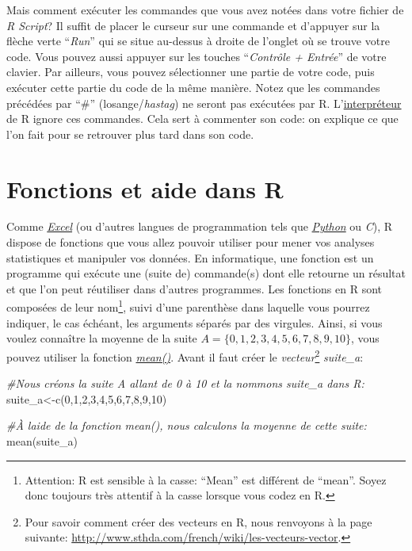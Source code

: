 \documentclass[
]{book}
\newenvironment{Shaded}{\begin{snugshade}}{\end{snugshade}}
\newcommand{\CommentTok}[1]{\textcolor[rgb]{0.56,0.35,0.01}{\textit{#1}}}
\newcommand{\DecValTok}[1]{\textcolor[rgb]{0.00,0.00,0.81}{#1}}
\newcommand{\FunctionTok}[1]{\textcolor[rgb]{0.00,0.00,0.00}{#1}}
\newcommand{\NormalTok}[1]{#1}
\newcommand{\OtherTok}[1]{\textcolor[rgb]{0.56,0.35,0.01}{#1}}
\begin{document}
Mais comment exécuter les commandes que vous avez notées dans votre fichier de \emph{R Script}? Il suffit de placer le curseur sur une commande et d'appuyer sur la flèche verte ``\emph{Run}'' qui se situe au-dessus à droite de l'onglet où se trouve votre code. Vous pouvez aussi appuyer sur les touches ``\emph{Contrôle + Entrée}'' de votre clavier. Par ailleurs, vous pouvez sélectionner une partie de votre code, puis exécuter cette partie du code de la même manière. Notez que les commandes précédées par ``\#'' (losange/\emph{hastag}) ne seront pas exécutées par R. L'\href{https://fr.wikipedia.org/wiki/Interpr\%C3\%A8te_(informatique)}{interpréteur} de R ignore ces commandes. Cela sert à commenter son code: on explique ce que l'on fait pour se retrouver plus tard dans son code.

\hypertarget{Fonctions_aides}{%
\section{Fonctions et aide dans R}\label{Fonctions_aides}}

Comme \href{https://www.microsoft.com/fr-be/microsoft-365/excel}{\emph{Excel}} (ou d'autres langues de programmation tels que \href{https://www.python.org/}{\emph{Python}} ou \emph{C}), R dispose de fonctions que vous allez pouvoir utiliser pour mener vos analyses statistiques et manipuler vos données. En informatique, une fonction est un programme qui exécute une (suite de) commande(s) dont elle retourne un résultat et que l'on peut réutiliser dans d'autres programmes. Les fonctions en R sont composées de leur nom\footnote{Attention: R est sensible à la casse: ``Mean'' est différent de ``mean''. Soyez donc toujours très attentif à la casse lorsque vous codez en R.}, suivi d'une parenthèse dans laquelle vous pourrez indiquer, le cas échéant, les arguments séparés par des virgules. Ainsi, si vous voulez connaître la moyenne de la suite \(A=\{0,1,2,3,4,5,6,7,8,9,10\}\), vous pouvez utiliser la fonction \href{https://www.rdocumentation.org/packages/base/versions/3.6.2/topics/mean}{\emph{mean()}}. Avant il faut créer le \emph{vecteur}\footnote{Pour savoir comment créer des vecteurs en R, nous renvoyons à la page suivante: \url{http://www.sthda.com/french/wiki/les-vecteurs-vector}.} \emph{suite\_a}:

\begin{Shaded}
\begin{Highlighting}[]
\CommentTok{\#Nous créons la suite A allant de 0 à 10 et la nommons suite\_a dans R:}
\NormalTok{suite\_a}\OtherTok{\textless{}{-}}\FunctionTok{c}\NormalTok{(}\DecValTok{0}\NormalTok{,}\DecValTok{1}\NormalTok{,}\DecValTok{2}\NormalTok{,}\DecValTok{3}\NormalTok{,}\DecValTok{4}\NormalTok{,}\DecValTok{5}\NormalTok{,}\DecValTok{6}\NormalTok{,}\DecValTok{7}\NormalTok{,}\DecValTok{8}\NormalTok{,}\DecValTok{9}\NormalTok{,}\DecValTok{10}\NormalTok{)}

\CommentTok{\#À l\textquotesingle{}aide de la fonction mean(), nous calculons la moyenne de cette suite:}
\FunctionTok{mean}\NormalTok{(suite\_a)}
\end{Highlighting}
\end{Shaded}
\end{document}
